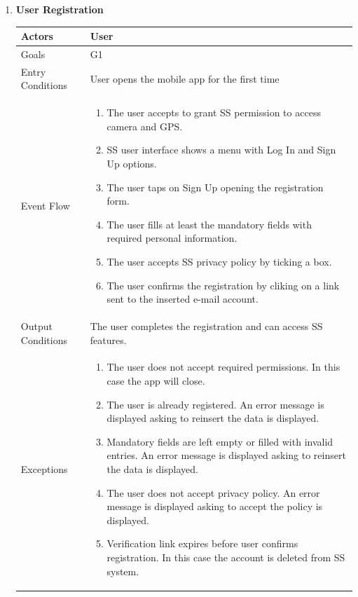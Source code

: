 	\begin{enumerate}
	\item \textbf{User Registration}
		\begin{table}[h!]
		\centering
		\begin{tabular}{|l|p{}|}
		\hline
		Actors            			&       	User\\ \hline
		Goals             			&         G1\\ \hline
		Entry Conditions  	&  		User opens the mobile app for the first time\\ \hline
		Event Flow        		&          
				\begin{enumerate}[label=\alph*)]
					\item The user accepts to grant SS permission to access camera and GPS.
					\item SS user interface shows a menu with Log In and Sign Up options.
					\item The user taps on Sign Up opening the registration form.
					\item The user fills at least the mandatory fields with required personal information.
					\item The user accepts SS privacy policy by ticking a box.
					\item The user confirms the registration by cliking on a link sent to the inserted e-mail account.
				\end{enumerate}\\ \hline
		Output Conditions &    		The user completes the registration and can access SS features.	\\ \hline
		Exceptions        		&       	
				\begin{enumerate}[label=\alph*)]
					\item The user does not accept required permissions. In this case the app will close.
					\item The user is already registered. An error message is displayed asking to reinsert the data is displayed.
					\item Mandatory fields are left empty or filled with invalid entries. An error message is displayed asking to reinsert the data is displayed.
					\item The user does not accept privacy policy. An error message is displayed asking to accept the policy is displayed.
					\item Verification link expires before user confirms registration. In this case the account is deleted from SS system.
				\end{enumerate}\\ \hline
	\end{tabular}
	\end{table}
	

\end{enumerate}
